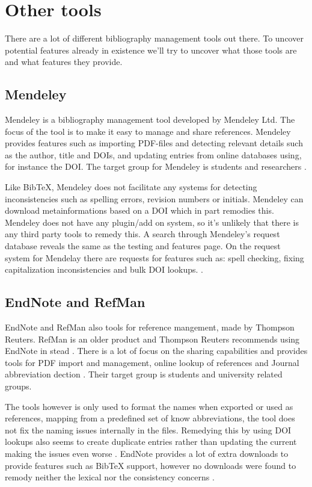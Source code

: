 \section{Other tools}
There are a lot of different bibliography management tools out there.
To uncover potential features already in existence we'll try to
uncover what those tools are and what features they provide.

\subsection{Mendeley}
Mendeley is a bibliography management tool developed by Mendeley Ltd.
The focus of the tool is to make it easy to manage and share
references.  Mendeley provides features such as importing PDF-files
and detecting relevant details such as the author, title and DOIs, and
updating entries from online databases using, for instance the DOI.
The target group for Mendeley is students and researchers
\cite{mendeley_features}.

Like BibTeX, Mendeley does not facilitate any systems for detecting
inconsistencies such as spelling errors, revision numbers or initials.
Mendeley can download metainformations based on a DOI which in part
remodies this.  Mendeley does not have any plugin/add on system, so
it's unlikely that there is any third party tools to remedy this. A
search through Mendeley's request database reveals the same as the
testing and features page.  On the request system for Mendelay there
are requests for features such as: spell checking, fixing
capitalization inconsistencies and bulk DOI lookups.
\cite{mendeley_request_spellcheck, mendeley_request_lowercase,
  mendeley_request_capitalization, mendeley_request_bulk_doi}.

\subsection{EndNote and RefMan}
EndNote and RefMan also tools for reference mangement, made by
Thompson Reuters.  RefMan is an older product and Thompson Reuters
recommends using EndNote in stead \cite{refman_switch,
  refman_features}.  There is a lot of focus on the sharing
capabilities and provides tools for PDF import and management, online
lookup of references and Journal abbreviation dection
\cite{endnote_basic_features, endnote_x7_features}.  Their target
group is students and university related groups.

The tools however is only used to format the names when exported or
used as references, mapping from a predefined set of know
abbreviations, the tool does not fix the naming issues internally in
the files\cite{endnote_terms_journals}.  Remedying this by using DOI
lookups also seems to create duplicate entries rather than updating
the current making the issues even worse .
EndNote provides a lot of extra downloads to provide features such as
Bib{\TeX} support, however no downloads were found to remody neither
the lexical nor the consistency concerns \cite{endnote_downloads}.

